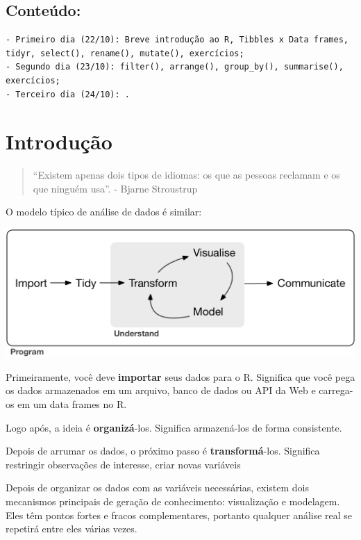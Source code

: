 \documentclass[a4paper]{book}
\begin{document}
\hypertarget{conteuxfado}{%
\section{Conteúdo:}\label{conteuxfado}}

\begin{verbatim}
- Primeiro dia (22/10): Breve introdução ao R, Tibbles x Data frames,
tidyr, select(), rename(), mutate(), exercícios; 
- Segundo dia (23/10): filter(), arrange(), group_by(), summarise(),
exercícios;
- Terceiro dia (24/10): .
\end{verbatim}

\hypertarget{intro}{%
\chapter{Introdução}\label{intro}}

\begin{quote}
``Existem apenas dois tipos de idiomas: os que as pessoas reclamam e os que ninguém usa''. - Bjarne Stroustrup
\end{quote}

O modelo típico de análise de dados é similar:

\begin{center}\includegraphics[width=0.75\linewidth]{imagens/data-science} \end{center}

Primeiramente, você deve \textbf{importar} seus dados para o R. Significa que você pega os dados armazenados em um arquivo, banco de dados ou API da Web e carrega-os em um data frames no R.

Logo após, a ideia é \textbf{organizá}-los. Significa armazená-los de forma consistente.

Depois de arrumar os dados, o próximo passo é \textbf{transformá}-los. Significa restringir observações de interesse, criar novas variáveis

Depois de organizar os dados com as variáveis necessárias, existem dois mecanismos principais de geração de conhecimento: visualização e modelagem. Eles têm pontos fortes e fracos complementares, portanto qualquer análise real se repetirá entre eles várias vezes.
\end{document}
